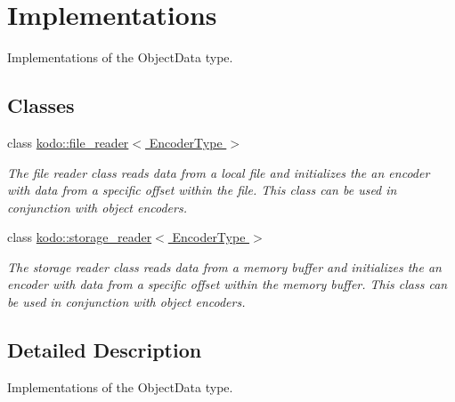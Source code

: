 \hypertarget{group__object__data__implementation}{\section{Implementations}
\label{group__object__data__implementation}
}


Implementations of the Object\-Data type.  


\subsection*{Classes}
\begin{DoxyCompactItemize}
\item 
class \hyperlink{classkodo_1_1file__reader}{kodo\-::file\-\_\-reader$<$ Encoder\-Type $>$}
\begin{DoxyCompactList}\small\item\em The file reader class reads data from a local file and initializes the an encoder with data from a specific offset within the file. This class can be used in conjunction with object encoders. \end{DoxyCompactList}\item 
class \hyperlink{classkodo_1_1storage__reader}{kodo\-::storage\-\_\-reader$<$ Encoder\-Type $>$}
\begin{DoxyCompactList}\small\item\em The storage reader class reads data from a memory buffer and initializes the an encoder with data from a specific offset within the memory buffer. This class can be used in conjunction with object encoders. \end{DoxyCompactList}\end{DoxyCompactItemize}


\subsection{Detailed Description}
Implementations of the Object\-Data type. 